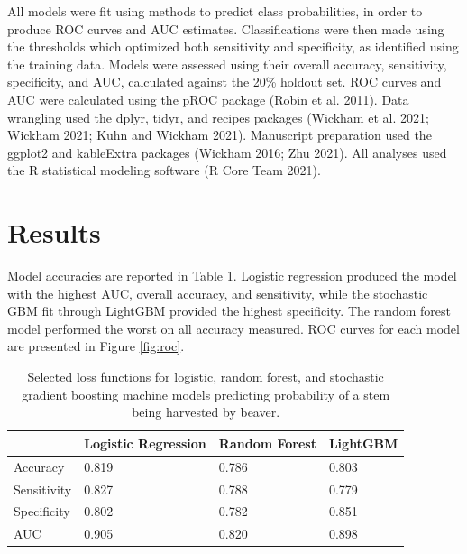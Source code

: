 \documentclass[]{elsarticle} %
\begin{document}
All models were fit using methods to predict class probabilities, in order to
produce ROC curves and AUC estimates. Classifications were then made using the
thresholds which optimized both sensitivity and specificity, as identified using
the training data. Models were assessed using their overall accuracy,
sensitivity, specificity, and AUC, calculated against the 20\% holdout set.
ROC curves and AUC were calculated using the pROC package (Robin et al. 2011). Data
wrangling used the dplyr, tidyr, and recipes packages (Wickham et al. 2021; Wickham 2021; Kuhn and Wickham 2021).
Manuscript preparation used the ggplot2 and kableExtra packages (Wickham 2016; Zhu 2021).
All
analyses used the R statistical modeling software (R Core Team 2021).

\hypertarget{results}{%
\section{Results}\label{results}}

Model accuracies are reported in Table \ref{tab:accuracy}.
Logistic regression produced the model with the highest AUC, overall accuracy,
and sensitivity, while the stochastic GBM fit through LightGBM provided the
highest specificity. The random forest model performed the worst on all accuracy
measured. ROC curves for each model are presented in Figure \ref{fig:roc}.

\begin{table}

\caption{\label{tab:accuracy}Selected loss functions for logistic, random forest, and stochastic gradient boosting machine models predicting probability of a stem being harvested by beaver.}
\centering
\begin{tabular}[t]{llll}
\toprule
\multicolumn{1}{c}{} & \multicolumn{1}{c}{Logistic Regression} & \multicolumn{1}{c}{Random Forest} & \multicolumn{1}{c}{LightGBM}\\
\midrule
Accuracy & 0.819 & 0.786 & 0.803\\
\addlinespace
Sensitivity & 0.827 & 0.788 & 0.779\\
\addlinespace
Specificity & 0.802 & 0.782 & 0.851\\
\addlinespace
AUC & 0.905 & 0.820 & 0.898\\
\bottomrule
\end{tabular}
\end{table}
\end{document}
